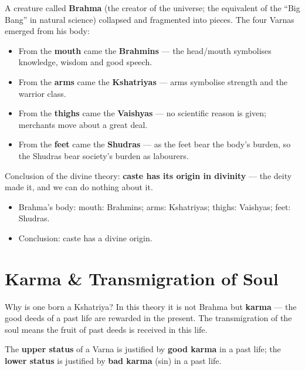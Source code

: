 A creature called \textbf{Brahma} (the creator of the universe; the equivalent of the ``Big Bang'' in natural science) collapsed and fragmented into pieces. The four Varnas emerged from his body:
\begin{itemize}
\item From the \textbf{mouth} came the \textbf{Brahmins} --- the head/mouth symbolises knowledge, wisdom and good speech.
\item From the \textbf{arms} came the \textbf{Kshatriyas} --- arms symbolise strength and the warrior class.
\item From the \textbf{thighs} came the \textbf{Vaishyas} --- no scientific reason is given; merchants move about a great deal.
\item From the \textbf{feet} came the \textbf{Shudras} --- as the feet bear the body's burden, so the Shudras bear society's burden as labourers.
\end{itemize}

\begin{KeyConcept}
Conclusion of the divine theory: \textbf{caste has its origin in divinity} --- the deity made it, and we can do nothing about it.
\end{KeyConcept}

\begin{QuickRevision}
\begin{itemize}
\item Brahma's body: mouth: Brahmins; arms: Kshatriyas; thighs: Vaishyas; feet: Shudras.
\item Conclusion: caste has a divine origin.
\end{itemize}
\end{QuickRevision}

\section{Karma \& Transmigration of Soul}

Why is one born a Kshatriya? In this theory it is not Brahma but \textbf{karma} --- the good deeds of a past life are rewarded in the present. The transmigration of the soul means the fruit of past deeds is received in this life.

\begin{KeyConcept}
The \textbf{upper status} of a Varna is justified by \textbf{good karma} in a past life; the \textbf{lower status} is justified by \textbf{bad karma} (sin) in a past life.
\end{KeyConcept}

